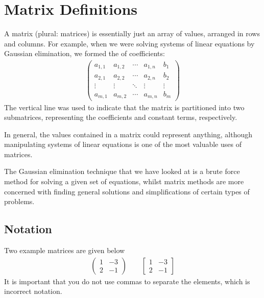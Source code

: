 \documentclass[letterpaper,10pt,english]{jupyterBook}
\begin{document}
\section{Matrix Definitions}
\label{\detokenize{LinearAlgebra/linear_systems_matrices/matrices:matrix-definitions}}
\sphinxAtStartPar
A matrix (plural: matrices) is essentially just an array of values, arranged in rows and columns. For example, when we were solving systems of linear equations by Gaussian elimination, we formed the  of coefficients:
\begin{equation*}
\begin{split}
\left(
\begin{array}{cccc|c}
    a_{1,1} & a_{1,2} & \cdots & a_{1,n} &  b_1 \\
    a_{2,1} & a_{2,2} & \cdots & a_{2,n} &  b_2 \\
    \vdots & \vdots & \ddots & \vdots & \vdots \\
    a_{m,1} & a_{m,2} & \cdots & a_{m,n} & b_m
\end{array}
\right)
\end{split}
\end{equation*}
\sphinxAtStartPar
The vertical line was used to indicate that the matrix is partitioned into two sub\sphinxhyphen{}matrices, representing the coefficients and constant terms, respectively.

\sphinxAtStartPar
In general, the values contained in a matrix could represent anything, although manipulating systems of linear equations is one of the most valuable uses of matrices.

\sphinxAtStartPar
The Gaussian elimination technique that we have looked at is a brute force method for solving a given set of equations, whilst matrix methods are more concerned with finding general solutions and simplifications of certain types of problems.


\subsection{Notation}
\label{\detokenize{LinearAlgebra/linear_systems_matrices/matrices:notation}}
\sphinxAtStartPar
Two example matrices are given below
\begin{equation}\label{equation:LinearAlgebra/linear_systems_matrices/matrices:square_matrix}
\begin{split}\left( \begin{matrix} 1 & -3 \\ 2 & -1 \end{matrix} \right) \qquad \left[ \begin{matrix} 1 & -3 \\ 2 & -1 \end{matrix} \right]\end{split}
\end{equation}
\sphinxAtStartPar
It is important that you do not use commas to separate the elements, which is incorrect notation.
\end{document}
